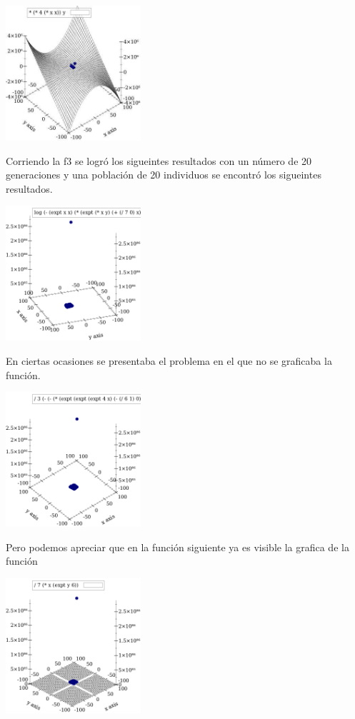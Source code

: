\documentclass[10pt,a4paper]{article}
\begin{document}
\begin{center}
\includegraphics[width=5cm, height=5cm]{f1-9}
\end{center}
Corriendo la f3 se logró los sigueintes resultados con un número de 20 generaciones y una población de 20 individuos se encontró los sigueintes resultados.\\
\begin{center}
\includegraphics[width=5cm, height=5cm]{19}
\end{center}
En ciertas ocasiones se presentaba el problema en el que no se graficaba la función.\\
\begin{center}
\includegraphics[width=5cm, height=5cm]{18}
\end{center}
Pero podemos apreciar que en la función siguiente ya es visible la grafica de la función
\begin{center}
\includegraphics[width=5cm, height=5cm]{17}
\end{center}
\end{document}
